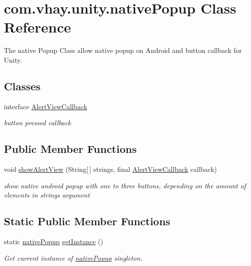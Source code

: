 \hypertarget{classcom_1_1vhay_1_1unity_1_1native_popup}{}\section{com.\+vhay.\+unity.\+native\+Popup Class Reference}
\label{classcom_1_1vhay_1_1unity_1_1native_popup}


The native Popup Class allow native popup on Android and button callback for Unity.  


\subsection*{Classes}
\begin{DoxyCompactItemize}
\item 
interface \mbox{\hyperlink{interfacecom_1_1vhay_1_1unity_1_1native_popup_1_1_alert_view_callback}{Alert\+View\+Callback}}
\begin{DoxyCompactList}\small\item\em button pressed callback \end{DoxyCompactList}\end{DoxyCompactItemize}
\subsection*{Public Member Functions}
\begin{DoxyCompactItemize}
\item 
void \mbox{\hyperlink{classcom_1_1vhay_1_1unity_1_1native_popup_a87b00a3bfaceb0d04684d0b882bec83b}{show\+Alert\+View}} (String\mbox{[}$\,$\mbox{]} strings, final \mbox{\hyperlink{interfacecom_1_1vhay_1_1unity_1_1native_popup_1_1_alert_view_callback}{Alert\+View\+Callback}} callback)
\begin{DoxyCompactList}\small\item\em show native android popup with one to three buttons, depending on the amount of elements in strings argument \end{DoxyCompactList}\end{DoxyCompactItemize}
\subsection*{Static Public Member Functions}
\begin{DoxyCompactItemize}
\item 
static \mbox{\hyperlink{classcom_1_1vhay_1_1unity_1_1native_popup}{native\+Popup}} \mbox{\hyperlink{classcom_1_1vhay_1_1unity_1_1native_popup_a62064472406ea7f13c73130ac7b7cb79}{get\+Instance}} ()
\begin{DoxyCompactList}\small\item\em Get current instance of \mbox{\hyperlink{classcom_1_1vhay_1_1unity_1_1native_popup}{native\+Popup}} singleton. \end{DoxyCompactList}\end{DoxyCompactItemize}
